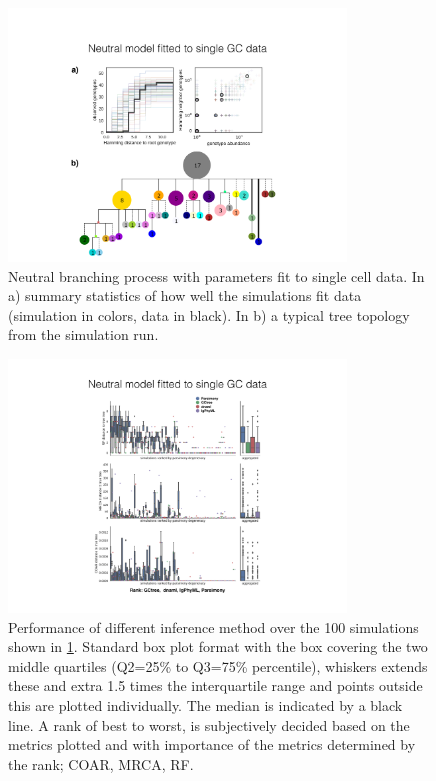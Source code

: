




\begin{figure}[!ht]
    \centering
    \includegraphics[width=0.8\textwidth]{figures/Tas-neutsim_runstat.pdf}
    \caption{
        \label{fig:Tas-neutsim_runstat}
        Neutral branching process with parameters fit to single cell data. In a) summary statistics of how well the simulations fit data (simulation in colors, data in black). In b) a typical tree topology from the simulation run.
    }
\end{figure}
\begin{figure}[!ht]
    \centering
    \includegraphics[width=0.8\textwidth]{figures/Tas-neutsim_vali.pdf}
    \caption{
        \label{fig:Tas-neutsim_vali}
        Performance of different inference method over the 100 simulations shown in \ref{fig:Tas-neutsim_runstat}.
        Standard box plot format with the box covering the two middle quartiles (Q2=25\% to Q3=75\% percentile), whiskers extends these and extra 1.5 times the interquartile range and points outside this are plotted individually.
        The median is indicated by a black line.
        A rank of best to worst, is subjectively decided based on the metrics plotted and with importance of the metrics determined by the rank; COAR, MRCA, RF.
    }
\end{figure}

